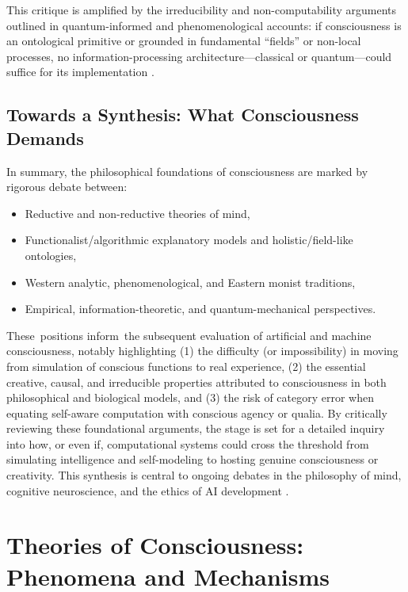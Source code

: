 This critique is amplified by the irreducibility and non-computability arguments outlined in quantum-informed and phenomenological accounts: if consciousness is an ontological primitive or grounded in fundamental ``fields'' or non-local processes, no information-processing architecture---classical or quantum---could suffice for its implementation \cite{faggin2024irreducible,garridomerchan2024machine,penrose1990emperors}.

\subsection{Towards a Synthesis: What Consciousness Demands}

In summary, the philosophical foundations of consciousness are marked by rigorous debate between:

\begin{itemize}
\item Reductive and non-reductive theories of mind,
\item Functionalist/algorithmic explanatory models and holistic/field-like ontologies,
\item Western analytic, phenomenological, and Eastern monist traditions,
\item Empirical, information-theoretic, and quantum-mechanical perspectives.
\end{itemize}

These~positions inform~the subsequent evaluation of artificial and machine consciousness, notably highlighting (1) the difficulty (or impossibility) in moving from simulation of conscious functions to real experience, (2) the essential creative, causal, and irreducible properties attributed to consciousness in both philosophical and biological models, and (3) the risk of category error when equating self-aware computation with conscious agency or qualia. By critically reviewing these foundational arguments, the stage is set for a detailed inquiry into how, or even if, computational systems could cross the threshold from simulating intelligence and self-modeling to hosting genuine consciousness or creativity. This synthesis is central to ongoing debates in the philosophy of mind, cognitive neuroscience, and the ethics of AI development \cite{butlin2023consciousness,francken2022consciousness}.

\section{Theories of Consciousness: Phenomena and Mechanisms}

